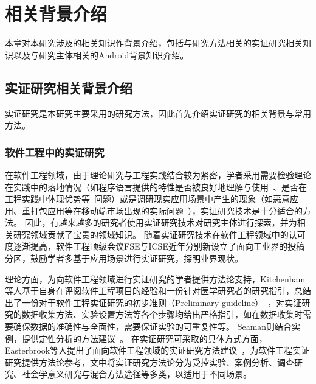 \chapter{相关背景介绍}
\label{chp:background}
%

本章对本研究涉及的相关知识作背景介绍，包括与研究方法相关的实证研究相关知识以及与研究主体相关的Android背景知识介绍。

\section{实证研究相关背景介绍}
实证研究是本研究主要采用的研究方法，因此首先介绍实证研究的相关背景与常用方法。

\subsection{软件工程中的实证研究}
在软件工程领域，由于理论研究与工程实践结合较为紧密，学者采用需要检验理论在实践中的落地情况（如程序语言提供的特性是否被良好地理解与使用~\cite{bieman1995reuse}、是否在工程实践中体现优势等~\cite{harrison2000experimental}问题）或是调研现实应用场景中产生的现象（如恶意应用、重打包应用等在移动端市场出现的实际问题~\cite{Felt2011ASO, Zhou2012DissectingAM, Andow2016ASO, wang2018android}），实证研究技术是十分适合的方法。
因此，有越来越多的研究者使用实证研究技术对研究主体进行探索\cite{Felt2011ASO, Zhou2012DissectingAM, Andow2016ASO, wang2018android, chen2018ausera, chen2018mobile, bieman1995reuse, harrison2000experimental, dybaa2008empirical, manotas2016empirical, mcintosh2016empirical, mcilroy2016fresh, wu2016ji, yang2015xin, hu2019dating, khanmohammadi2019empirical}，并为相关研究领域贡献了宝贵的领域知识。
随着实证研究技术在软件工程领域中的认可度逐渐提高，软件工程顶级会议FSE与ICSE近年分别新设立了面向工业界的投稿分区，鼓励学者多基于应用场景进行实证研究，探明业界现状。

理论方面，为向软件工程领域进行实证研究的学者提供方法论支持，Kitchenham等人基于自身在评阅软件工程项目的经验和一份针对医学研究者的研究指引，总结出了一份对于软件工程实证研究的初步准则（Preliminary guideline）~\cite{kitchenham2002preliminary}，对实证研究的数据收集方法、实验设置方法等各个步骤均给出严格指引，如在数据收集时需要确保数据的准确性与全面性，需要保证实验的可重复性等。
Seaman则结合实例，提供定性分析的方法建议~\cite{seaman1999qualitative}。
在实证研究可采取的具体方式方面，Easterbrook等人提出了面向软件工程领域的实证研究方法建议~\cite{easterbrook2008selecting}，为软件工程实证研究提供方法论参考，文中将实证研究方法论分为受控实验、案例分析、调查研究、社会学意义研究与混合方法途径等多类，以适用于不同场景。


